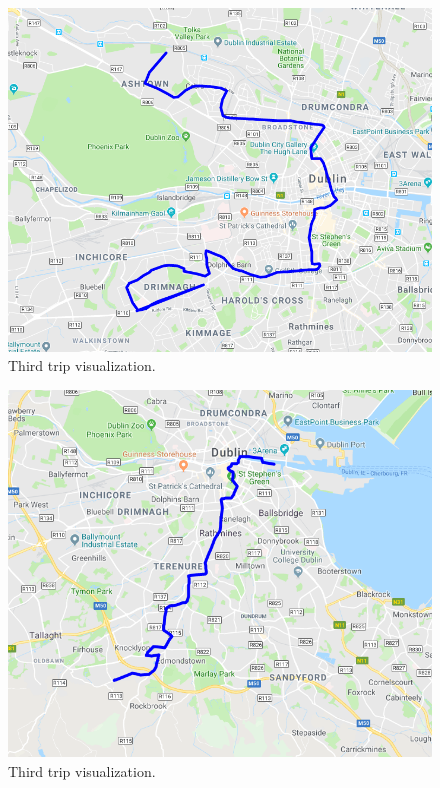 \documentclass[12pt]{article}
\begin{document}
	\begin{figure} [H]
		\begin{center}
			\includegraphics [scale = 0.75] {questionC4.png}
			\caption{Third trip visualization.}
		\end{center}
		\label{gmlplot_example}
	\end{figure}

	\begin{figure} [H]
		\begin{center}
			\includegraphics [scale = 0.75] {questionC5.png}
			\caption{Third trip visualization.}
		\end{center}
		\label{gmlplot_example}
	\end{figure}
	
\end{document}
